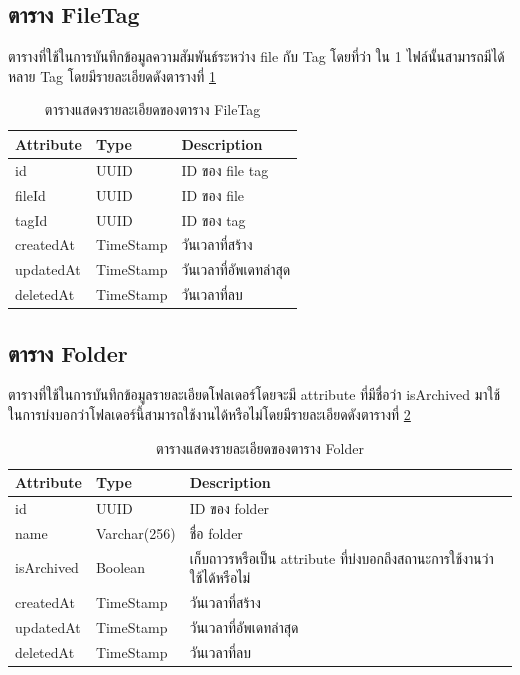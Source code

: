 \documentclass[12pt,oneside,openright,a4paper]{cpe-thai-project}
\begin{document}
\subsection{ตาราง FileTag}
ตารางที่ใช้ในการบันทึกข้อมูลความสัมพันธ์ระหว่าง file กับ Tag โดยที่ว่า ใน 1 ไฟล์นั้นสามารถมีได้หลาย Tag โดยมีรายละเอียดดังตารางที่ \ref{tbl:dbFileTag}
\begin{table}[!h]
    \centering
    \begin{tabular}{|l|l|l|}
    \hline
    \textbf{Attribute} & \textbf{Type} & \textbf{Description}   \\ \hline
    id                 & UUID          & ID ของ file tag        \\ \hline
    fileId             & UUID          & ID ของ file            \\ \hline
    tagId              & UUID          & ID ของ tag             \\ \hline
    createdAt          & TimeStamp     & วันเวลาที่สร้าง        \\ \hline
    updatedAt          & TimeStamp     & วันเวลาที่อัพเดทล่าสุด \\ \hline
    deletedAt          & TimeStamp     & วันเวลาที่ลบ          \\ \hline
    \end{tabular}
    \caption{\centering  ตารางแสดงรายละเอียดของตาราง FileTag} \label{tbl:dbFileTag}
\end{table}

\subsection{ตาราง Folder}
ตารางที่ใช้ในการบันทึกข้อมูลรายละเอียดโฟลเดอร์โดยจะมี attribute ที่มีชื่อว่า isArchived มาใช้ในการบ่งบอกว่าโฟลเดอร์นี้สามารถใช้งานได้หรือไม่โดยมีรายละเอียดดังตารางที่ \ref{tbl:dbFolder}
\begin{table}[!h]
    \centering
    \begin{tabular}{|l|l|l|}
    \hline
    \textbf{Attribute} & \textbf{Type} & \textbf{Description}   \\ \hline
    id        & UUID        & ID ของ folder          \\ \hline
    name      & Varchar(256) & ชื่อ folder            \\ \hline
    isArchived         & Boolean          & เก็บถาวรหรือเป็น attribute ที่บ่งบอกถึงสถานะการใช้งานว่าใช้ได้หรือไม่ \\ \hline
    createdAt & TimeStamp   & วันเวลาที่สร้าง        \\ \hline
    updatedAt & TimeStamp   & วันเวลาที่อัพเดทล่าสุด \\ \hline
    deletedAt & TimeStamp   & วันเวลาที่ลบ             \\ \hline
    \end{tabular}
    \caption{\centering  ตารางแสดงรายละเอียดของตาราง Folder} \label{tbl:dbFolder}
\end{table}
\end{document}
